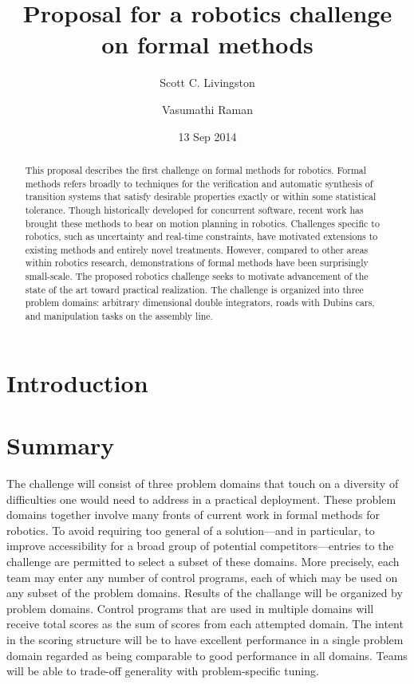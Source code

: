 \documentclass[12pt]{amsart}
\theoremstyle{definition}
\begin{document}
\title{Proposal for a robotics challenge on formal methods}
\author{Scott C. Livingston \and Vasumathi Raman}
\date{13 Sep 2014}
\begin{abstract}
This proposal describes the first challenge on formal methods for robotics.
Formal methods refers broadly to techniques for the verification and automatic
synthesis of transition systems that satisfy desirable properties exactly or
within some statistical tolerance.  Though historically developed for concurrent
software, recent work has brought these methods to bear on motion planning in
robotics.  Challenges specific to robotics, such as uncertainty and real-time
constraints, have motivated extensions to existing methods and entirely novel
treatments.  However, compared to other areas within robotics research,
demonstrations of formal methods have been surprisingly small-scale.  The
proposed robotics challenge seeks to motivate advancement of the state of the
art toward practical realization.  The challenge is organized into three problem
domains: arbitrary dimensional double integrators, roads with Dubins cars, and
manipulation tasks on the assembly line.
\end{abstract}
\maketitle


\section{Introduction}



\section{Summary}

The challenge will consist of three problem domains that touch on a diversity of
difficulties one would need to address in a practical deployment.  These problem
domains together involve many fronts of current work in formal methods for
robotics.  To avoid requiring too general of a solution---and in particular, to
improve accessibility for a broad group of potential competitors---entries to
the challenge are permitted to select a subset of these domains.  More
precisely, each team may enter any number of control programs, each of which may
be used on any subset of the problem domains.  Results of the challange will be
organized by problem domains.  Control programs that are used in multiple
domains will receive total scores as the sum of scores from each attempted
domain.  The intent in the scoring structure will be to have excellent
performance in a single problem domain regarded as being comparable to good
performance in all domains.  Teams will be able to trade-off generality with
problem-specific tuning.
\end{document}
